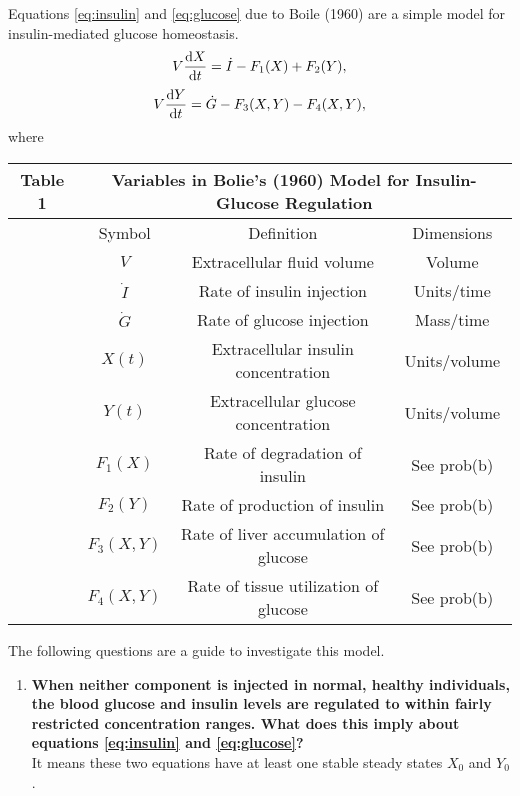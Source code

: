 \begin{homeworkProblem}
Equations \eqref{eq:insulin} and \eqref{eq:glucose} due to Boile (1960) are a
simple model for insulin-mediated glucose homeostasis.
\begin{equation}
    V \deriv[t]{X} = \dot{I} - F_1(X) + F_2(Y), \label{eq:insulin}
\end{equation}
\begin{equation}
    V \deriv[t]{Y} = \dot{G} - F_3(X, Y) - F_4(X, Y), \label{eq:glucose}
\end{equation}
where
\begin{table}[h]
\centering
\begin{tabular}{c c|c|c}
\textbf{Table 1} &
\multicolumn{3}{c}{Variables in Bolie's (1960) Model for Insulin-Glucose Regulation }\\
\hline
& Symbol & Definition & Dimensions \\
\hline
& $V$ & Extracellular fluid volume & Volume \\
& $\dot{I}$ & Rate of insulin injection & Units/time \\
& $\dot{G}$ & Rate of glucose injection & Mass/time \\
& $X(t)$ & Extracellular insulin concentration & Units/volume \\
& $Y(t)$ & Extracellular glucose concentration & Units/volume \\
& $F_1(X)$ & Rate of degradation of insulin & {\color{blue} See prob(b)} \\
& $F_2(Y)$ & Rate of production of insulin & {\color{blue} See prob(b)} \\
& $F_3(X, Y)$ & Rate of liver accumulation of glucose & {\color{blue} See prob(b)} \\
& $F_4(X, Y)$ & Rate of tissue utilization of glucose & {\color{blue} See prob(b)} \\
\hline
\end{tabular}
\end{table}
The following questions are a guide to investigate this model.
\begin{enumerate}
\item \textbf{When neither component is injected in normal, healthy individuals, the
blood glucose and insulin levels are regulated to within fairly restricted
concentration ranges. What does this imply about equations \eqref{eq:insulin}
and \eqref{eq:glucose}?}\\

It means these two equations have at least one stable steady states $X_0$ and $Y_0$.
\\


\end{enumerate}
\end{homeworkProblem}
